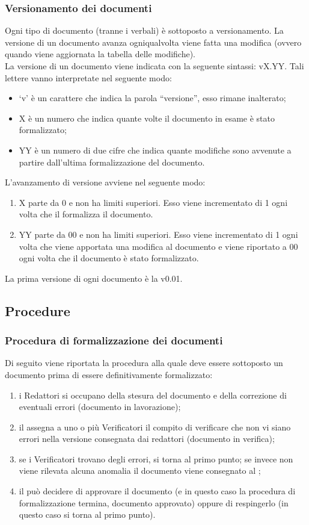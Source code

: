 		\subsubsection{Versionamento dei documenti}
			Ogni tipo di documento (tranne i verbali) è sottoposto a versionamento. La versione di un documento avanza ogniqualvolta viene fatta una modifica (ovvero quando viene aggiornata la tabella delle modifiche).\\
			La versione di un documento viene indicata con la seguente sintassi: vX.YY. Tali lettere vanno interpretate nel seguente modo:
			\begin{itemize}
				\item ‘v’ è un carattere che indica la parola “versione”, esso rimane inalterato;
				\item X è un numero che indica quante volte il documento in esame è stato formalizzato;
				\item YY è un numero di due cifre che indica quante modifiche sono avvenute a partire dall’ultima formalizzazione del documento.
			\end{itemize}
			L’avanzamento di versione avviene nel seguente modo:
			\begin{enumerate}
				\item X parte da 0 e non ha limiti superiori. Esso viene incrementato di 1 ogni volta che il  formalizza il documento.
				\item YY parte da 00 e non ha limiti superiori. Esso viene incrementato di 1 ogni volta che viene apportata una modifica al documento e viene riportato a 00 ogni volta che il documento è stato formalizzato.
			\end{enumerate}
			La prima versione di ogni documento è la v0.01.
	\subsection{Procedure}
		\subsubsection{Procedura di formalizzazione dei documenti}
			Di seguito viene riportata la procedura alla quale deve essere sottoposto un documento prima di essere definitivamente formalizzato:
			\begin{enumerate}
				\item i Redattori si occupano della stesura del documento e della correzione di eventuali errori (documento in lavorazione);
				\item il  assegna a uno o più Verificatori il compito di verificare che non vi siano errori nella versione consegnata dai redattori (documento in verifica);
				\item se i Verificatori trovano degli errori, si torna al primo punto; se invece non viene rilevata alcuna anomalia il documento viene consegnato al ;
				\item il  può decidere di approvare il documento (e in questo caso la procedura di formalizzazione termina, documento approvato) oppure di respingerlo (in questo caso si torna al primo punto).
			\end{enumerate}
